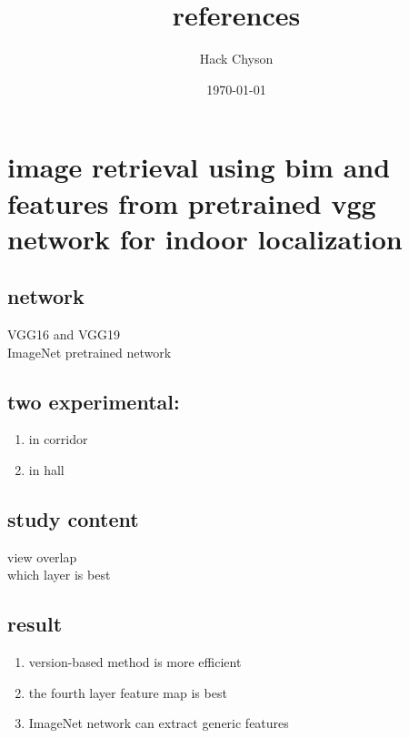 \documentclass[11pt]{article}
\author{Hack Chyson}
\date{\today}
\title{references}
\begin{document}
\maketitle
\tableofcontents

\section{image retrieval using bim and features from pretrained vgg network for indoor localization}
\label{sec-1}

\subsection{network}
\label{sec-1-1}
VGG16 and VGG19 \\

ImageNet pretrained network \\


\subsection{two experimental:}
\label{sec-1-2}
\begin{enumerate}
\item in corridor \\
\item in hall \\
\end{enumerate}


\subsection{study content}
\label{sec-1-3}
view overlap \\
which layer is best \\

\subsection{result}
\label{sec-1-4}
\begin{enumerate}
\item version-based method is more efficient \\
\item the fourth layer feature map is best \\
\item ImageNet network can extract generic features \\
\end{enumerate}
\end{document}

